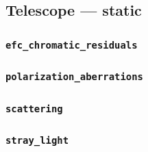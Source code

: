 %
%
%

\subsection{Telescope --- static}
\label{sec:telescope-static}


\subsubsection{\texttt{efc\_chromatic\_residuals}}
\label{sec:telescope-static-efc-chromatic-residuals}


\subsubsection{\texttt{polarization\_aberrations}}
\label{sec:telescope-static-polarization-aberrations}


\subsubsection{\texttt{scattering}}
\label{sec:telescope-static-scattering}


\subsubsection{\texttt{stray\_light}}
\label{sec:telescope-static-stray-light}


